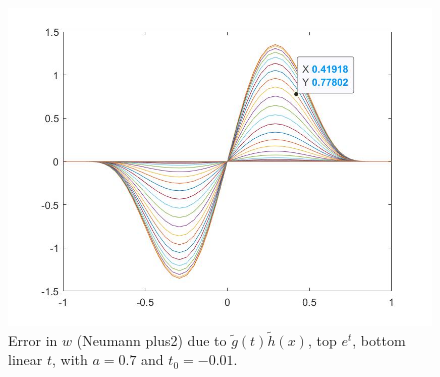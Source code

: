 \documentclass[11pt, a4paper]{article}
\theoremstyle{definition}
\begin{document}
\begin{figure}[h]
	\includegraphics[scale=0.3]{PerttxN4.jpg}
	\caption{Error in $w$ (Neumann plus2) due to $\tilde g(t) \tilde h(x)$, top $e^t$, bottom linear $t$, with $a =0.7$ and $t_0 = -0.01$.}
	\label{Perttx1}
\end{figure}
\end{document}
